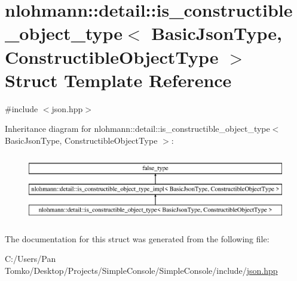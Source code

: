 \hypertarget{structnlohmann_1_1detail_1_1is__constructible__object__type}{}\section{nlohmann\+::detail\+::is\+\_\+constructible\+\_\+object\+\_\+type$<$ Basic\+Json\+Type, Constructible\+Object\+Type $>$ Struct Template Reference}
\label{structnlohmann_1_1detail_1_1is__constructible__object__type}


{\ttfamily \#include $<$json.\+hpp$>$}

Inheritance diagram for nlohmann\+::detail\+::is\+\_\+constructible\+\_\+object\+\_\+type$<$ Basic\+Json\+Type, Constructible\+Object\+Type $>$\+:\begin{figure}[H]
\begin{center}
\leavevmode
\includegraphics[height=2.984014cm]{dc/d11/structnlohmann_1_1detail_1_1is__constructible__object__type}
\end{center}
\end{figure}


The documentation for this struct was generated from the following file\+:\begin{DoxyCompactItemize}
\item 
C\+:/\+Users/\+Pan Tomko/\+Desktop/\+Projects/\+Simple\+Console/\+Simple\+Console/include/\mbox{\hyperlink{json_8hpp}{json.\+hpp}}\end{DoxyCompactItemize}

